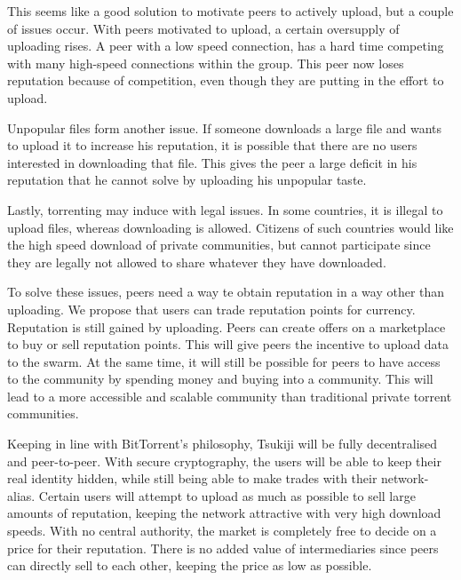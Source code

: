 This seems like a good solution to motivate peers to actively upload, but a couple of issues occur.
With peers motivated to upload, a certain oversupply of uploading rises.
A peer with a low speed connection, has a hard time competing with many high-speed connections within the group.
This peer now loses reputation because of competition, even though they are putting in the effort to upload.

Unpopular files form another issue.
If someone downloads a large file and wants to upload it to increase his reputation, it is possible that there are no users interested in downloading that file.
This gives the peer a large deficit in his reputation that he cannot solve by uploading his unpopular taste.

Lastly, torrenting may induce with legal issues. In some countries, it is illegal to upload files, whereas downloading is allowed.
Citizens of such countries would like the high speed download of private communities, but cannot participate since they are legally not allowed to share whatever they have downloaded.

To solve these issues, peers need a way te obtain reputation in a way other than uploading.
We propose that users can trade reputation points for currency.
Reputation is still gained by uploading.
Peers can create offers on a marketplace to buy or sell reputation points.
This will give peers the incentive to upload data to the swarm.
At the same time, it will still be possible for peers to have access to the community by spending money and buying into a community.
This will lead to a more accessible and scalable community than traditional private torrent communities.

Keeping in line with BitTorrent's philosophy, Tsukiji will be fully decentralised and peer-to-peer.
With secure cryptography, the users will be able to keep their real identity hidden, while still being able to make trades with their network-alias.
Certain users will attempt to upload as much as possible to sell large amounts of reputation, keeping the network attractive with very high download speeds.
With no central authority, the market is completely free to decide on a price for their reputation.
There is no added value of intermediaries since peers can directly sell to each other, keeping the price as low as possible.


